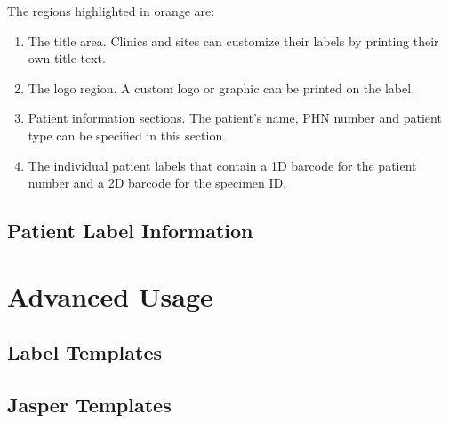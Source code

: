 The regions highlighted in orange are:
\begin{enumerate}
  \item The title area. Clinics and sites can customize their labels by
    printing their own title text.
  \item The logo region. A custom logo or graphic can be printed on the label.
  \item Patient information sections. The patient's name, PHN number and
    patient type can be specified in this section.
  \item The individual patient labels that contain a 1D barcode for the patient
    number and a 2D barcode for the specimen ID.
\end{enumerate}

\subsection{Patient Label Information}

\section{Advanced Usage}

\subsection{Label Templates}

\subsection{Jasper Templates}
